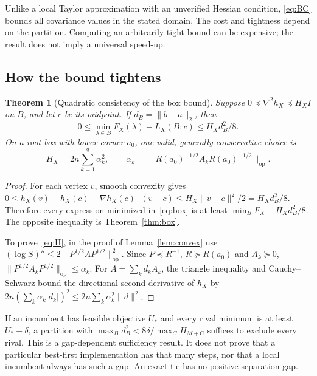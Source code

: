 \documentclass[11pt,a4paper]{article}
\newtheorem{theorem}{Theorem}
\theoremstyle{remark}\newtheorem{remark}[theorem]{Remark}
\begin{document}
Unlike a local Taylor approximation with an unverified Hessian condition,
\eqref{eq:BC} bounds all covariance values in the stated domain. The cost and
tightness depend on the partition. Computing an arbitrarily tight bound can be
expensive; the result does not imply a universal speed-up.

\subsection{How the bound tightens}
\begin{theorem}[Quadratic consistency of the box bound]\label{thm:rate}
Suppose $0\preceq\nabla^2 h_X\preceq H_XI$ on $B$, and let $c$ be its midpoint.
If $d_B=\|b-a\|_2$, then
\begin{equation}\label{eq:rate}
0\leq\min_{\lambda\in B}F_X(\lambda)-L_X(B;c)
\leq H_Xd_B^2/8.
\end{equation}
On a root box with lower corner $a_0$, one valid, generally conservative choice is
\begin{equation}\label{eq:H}
H_X=2n\sum_{k=1}^q\alpha_k^2,\qquad
\alpha_k=\|R(a_0)^{-1/2}A_kR(a_0)^{-1/2}\|_{\mathrm{op}}.
\end{equation}
\end{theorem}
\begin{proof}
For each vertex $v$, smooth convexity gives
$0\leq h_X(v)-h_X(c)-\nabla h_X(c)^\top(v-c)\leq H_X\|v-c\|^2/2
=H_Xd_B^2/8$. Therefore every expression minimized in~\eqref{eq:box} is at least
$\min_BF_X-H_Xd_B^2/8$. The opposite inequality is Theorem~\ref{thm:box}.

To prove~\eqref{eq:H}, in the proof of Lemma~\ref{lem:convex} use
$(\log S)''\leq2\|P^{1/2}AP^{1/2}\|_{\mathrm{op}}^2$. Since
$P\preceq R^{-1}$, $R\succeq R(a_0)$ and $A_k\succeq0$,
$\|P^{1/2}A_kP^{1/2}\|_{\mathrm{op}}\leq\alpha_k$. For
$A=\sum_kd_kA_k$, the triangle inequality and Cauchy--Schwarz bound the directional
second derivative of $h_X$ by $2n(\sum_k\alpha_k|d_k|)^2
\leq2n\sum_k\alpha_k^2\|d\|^2$.
\end{proof}

If an incumbent has feasible objective $U_*$ and every rival minimum is at least
$U_*+\delta$, a partition with
$\max_Bd_B^2<8\delta/\max_CH_{M+C}$ suffices to exclude every rival. This is a
gap-dependent sufficiency result. It does not prove that a particular best-first
implementation has that many steps, nor that a local incumbent always has such
a gap. An exact tie has no positive separation gap.
\end{document}
